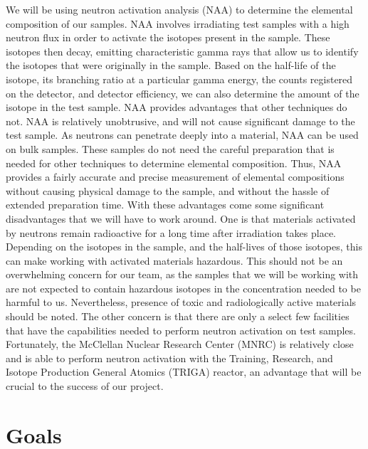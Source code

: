 \documentclass[]{article}
\begin{document}
We will be using neutron activation analysis (NAA) to determine the elemental composition of our samples. NAA involves irradiating test samples with a high neutron flux in order to activate the isotopes present in the sample. These isotopes then decay, emitting characteristic gamma rays that allow us to identify the isotopes that were originally in the sample. Based on the half-life of the isotope, its branching ratio at a particular gamma energy, the counts registered on the detector, and detector efficiency, we can also determine the amount of the isotope in the test sample. NAA provides advantages that other techniques do not. NAA is relatively unobtrusive, and will not cause significant damage to the test sample. As neutrons can penetrate deeply into a material, NAA can be used on bulk samples. These samples do not need the careful preparation that is needed for other techniques to determine elemental composition. Thus, NAA provides a fairly accurate and precise measurement of elemental compositions without causing physical damage to the sample, and without the hassle of extended preparation time. With these advantages come some significant disadvantages that we will have to work around. One is that materials activated by neutrons remain radioactive for a long time after irradiation takes place. Depending on the isotopes in the sample, and the half-lives of those isotopes, this can make working with activated materials hazardous. This should not be an overwhelming concern for our team, as the samples that we will be working with are not expected to contain hazardous isotopes in the concentration needed to be harmful to us. Nevertheless, presence of toxic and radiologically active materials should be noted. The other concern is that there are only a select few facilities that have the capabilities needed to perform neutron activation on test samples. Fortunately, the McClellan Nuclear Research Center (MNRC) is relatively close and is able to perform neutron activation with the Training, Research, and Isotope Production General Atomics (TRIGA) reactor, an advantage that will be crucial to the success of our project.

            
\pagebreak


\section{Goals}
\end{document}
